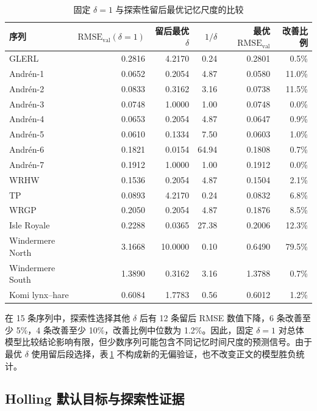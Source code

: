 \documentclass[12pt,a4paper]{ctexart}
\newcommand{\valrmse}{\mathrm{RMSE}_{\mathrm{val}}}
\begin{document}
\begin{landscape}
\begin{table}[H]
 \centering
 \caption{固定 $\delta=1$ 与探索性留后最优记忆尺度的比较}
 \label{tab:delta-holdout}
 \small
 \begin{tabular}{lrrrrr}
  \toprule
  序列 & $\valrmse(\delta=1)$ & 留后最优 $\delta$ & $1/\delta$ & 最优 $\valrmse$ & 改善比例\\
  \midrule
  GLERL & 0.2816 & 4.2170 & 0.24 & 0.2801 & 0.5\%\\
  Andrén-1 & 0.0652 & 0.2054 & 4.87 & 0.0580 & 11.0\%\\
  Andrén-2 & 0.0833 & 0.3162 & 3.16 & 0.0738 & 11.5\%\\
  Andrén-3 & 0.0748 & 1.0000 & 1.00 & 0.0748 & 0.0\%\\
  Andrén-4 & 0.0653 & 0.2054 & 4.87 & 0.0647 & 0.9\%\\
  Andrén-5 & 0.0610 & 0.1334 & 7.50 & 0.0603 & 1.0\%\\
  Andrén-6 & 0.1821 & 0.0154 & 64.94 & 0.1808 & 0.7\%\\
  Andrén-7 & 0.1912 & 1.0000 & 1.00 & 0.1912 & 0.0\%\\
  WRHW & 0.1536 & 0.2054 & 4.87 & 0.1504 & 2.1\%\\
  TP & 0.0893 & 4.2170 & 0.24 & 0.0832 & 6.8\%\\
  WRGP & 0.2050 & 0.2054 & 4.87 & 0.1876 & 8.5\%\\
  Isle Royale & 0.2288 & 0.0365 & 27.38 & 0.2006 & 12.3\%\\
  Windermere North & 3.1668 & 10.0000 & 0.10 & 0.6490 & 79.5\%\\
  Windermere South & 1.3890 & 0.3162 & 3.16 & 1.3788 & 0.7\%\\
  Komi lynx--hare & 0.6084 & 1.7783 & 0.56 & 0.6012 & 1.2\%\\
  \bottomrule
 \end{tabular}
\end{table}
\end{landscape}

在 15 条序列中，探索性选择其他 $\delta$ 后有 12 条留后 RMSE 数值下降，6 条改善至少 5\%，4 条改善至少 10\%，改善比例中位数为 1.2\%。因此，固定 $\delta=1$ 对总体模型比较结论影响有限，但少数序列可能包含不同记忆时间尺度的预测信号。由于最优 $\delta$ 使用留后段选择，表\,\ref{tab:delta-holdout} 不构成新的无偏验证，也不改变正文的模型胜负统计。

\subsection{Holling 默认目标与探索性证据}
\end{document}
